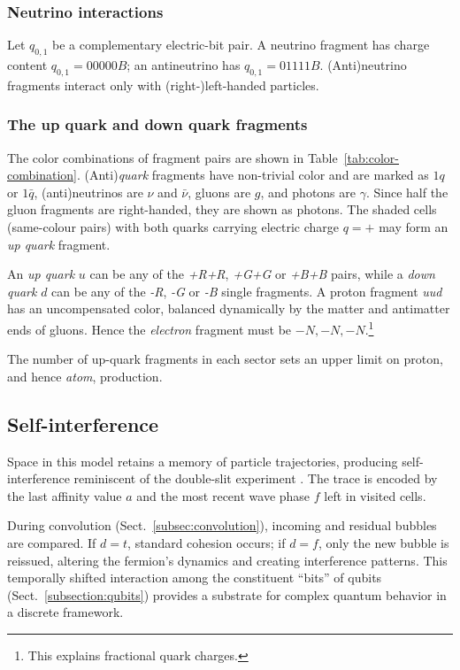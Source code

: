 \documentclass{ijuc}
\begin{document}
\subsubsection{Neutrino interactions}

Let $q_{0,1}$ be a complementary electric-bit pair. A neutrino fragment has charge content $q_{0,1}=00000B$; an antineutrino has $q_{0,1}=01111B$. (Anti)neutrino fragments interact only with (right-)left-handed particles.

\subsubsection{The up quark and down quark fragments}

The color combinations of fragment pairs are shown in Table~\ref{tab:color-combination}. 
(Anti)\emph{quark} fragments have non-trivial color and are marked as $1q$ or $1\bar{q}$, (anti)neutrinos are $\nu$ and $\bar{\nu}$, gluons are $g$, and photons are $\gamma$. 
Since half the gluon fragments are right-handed, they are shown as photons. 
The shaded cells (same-colour pairs) with both quarks carrying electric charge $q=+$ may form an \emph{up quark} fragment. 

An \emph{up quark} $u$ can be any of the \emph{+R+R}, \emph{+G+G} or \emph{+B+B} pairs, while a \emph{down quark} $d$ can be any of the \emph{-R}, \emph{-G} or \emph{-B} single fragments. A proton fragment \emph{uud} has an uncompensated color, balanced dynamically by the matter and antimatter ends of gluons. Hence the \emph{electron} fragment must be $-N,-N,-N$.\footnote{This explains fractional quark charges.}

The number of up-quark fragments in each sector sets an upper limit on proton, and hence \textit{atom}, production.

\subsection{Self-interference\label{subsec:Interference}}

Space in this model retains a memory of particle trajectories, producing self-interference reminiscent of the double-slit experiment \cite{feynman-2}. The trace is encoded by the last affinity value $a$ and the most recent wave phase $f$ left in visited cells.

During convolution (Sect.~\ref{subsec:convolution}), incoming and residual bubbles are compared. If $d=t$, standard cohesion occurs; if $d=f$, only the new bubble is reissued, altering the fermion's dynamics and creating interference patterns. This temporally shifted interaction among the constituent ``bits'' of qubits (Sect.~\ref{subsection:qubits}) provides a substrate for complex quantum behavior in a discrete framework.
\end{document}
